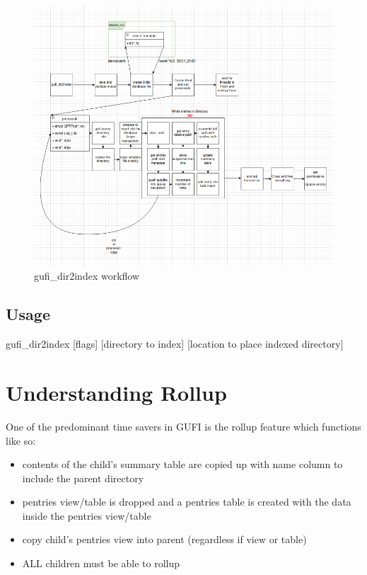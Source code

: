 \documentclass{article}
\begin{document}
\begin{figure} [h]
\centering
\includegraphics[width=1.0\textwidth]{gufi_dir2index.png}
\caption{\label{fig:gufi_dir2index}gufi\_dir2index workflow}
\end{figure}

\subsection{Usage}
gufi\_dir2index [flags] [directory to index] [location to place indexed directory]


\section{Understanding Rollup}
One of the predominant time savers in GUFI is the rollup feature which functions like so: \\
\begin{itemize}
  \item contents of the child's summary table are copied up with name column to include the parent directory
  \item pentries view/table is dropped and a pentries table is created with the data inside the pentries view/table
  \item copy child's pentries view into parent (regardless if view or table)
  \item ALL children must be able to rollup
\end{itemize}
\end{document}
